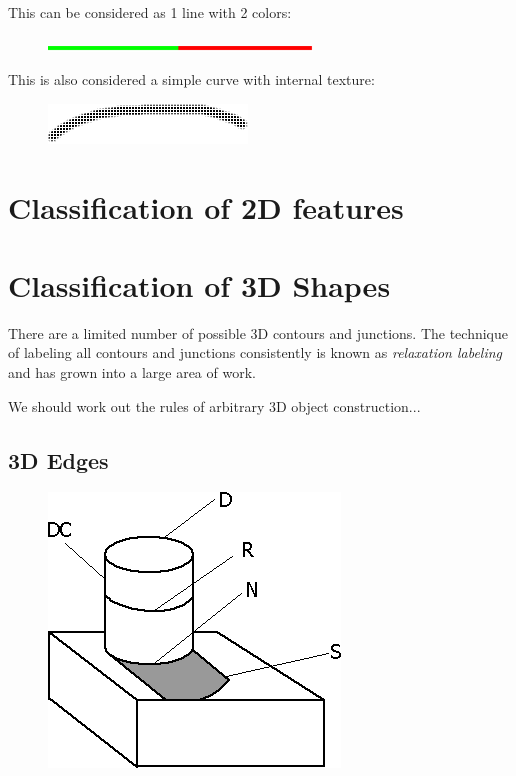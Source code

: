 This can be considered as  1 line with 2 colors:

\begin{figure}[H]
\centering
\includegraphics[scale=0.7]{Line9.png}
\end{figure}

This is also considered a simple curve with internal texture:

\begin{figure}[H]
\centering
\includegraphics[scale=0.7]{Line10.PNG}
\end{figure}

\underconst

\section{Classification of 2D features}

\underconst

\section{Classification of 3D Shapes}

There are a limited number of possible 3D contours and junctions. The technique of labeling all contours and junctions consistently is known as \emph{relaxation labeling} and has grown into a large area of work.

We should work out the rules of arbitrary 3D object construction...

\underconst

\subsection{3D Edges}

\begin{figure}[H]
\centering
\includegraphics[scale=0.7]{3DContours.PNG}
\end{figure}

